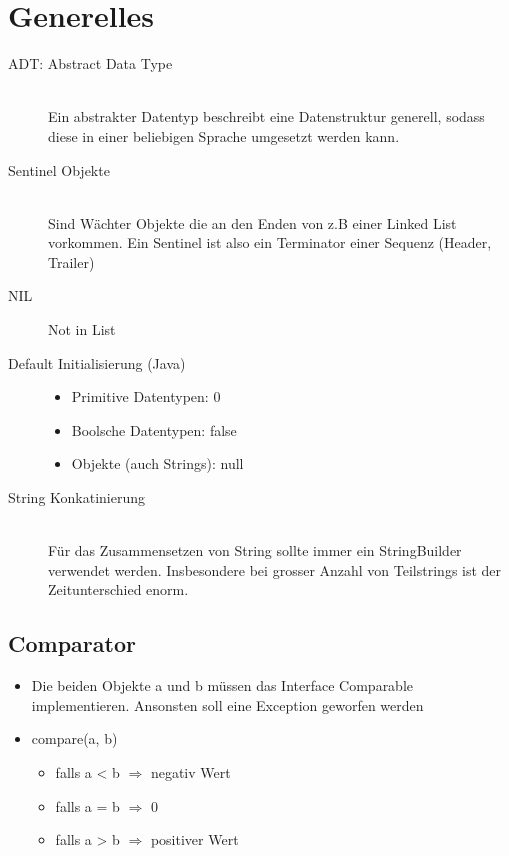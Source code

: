 


\newcommand{\SUBJECT}{Zusammenfassung}
\newcommand{\TITLE}{Algorithmen und Datenstrukturen 1}



\section{Generelles}
\begin{description}
	\item[ADT: Abstract Data Type] \hfill \\
	Ein abstrakter Datentyp beschreibt eine Datenstruktur generell, sodass diese in einer beliebigen Sprache umgesetzt werden kann.
	\item[Sentinel Objekte] \hfill \\
	Sind Wächter Objekte die an den Enden von z.B einer Linked List vorkommen. Ein Sentinel ist also ein Terminator einer Sequenz (Header, Trailer)
	\item[NIL] Not in List
	\item[Default Initialisierung (Java)] \hfill
	\begin{itemize}
		\item Primitive Datentypen: 0
		\item Boolsche Datentypen: false
		\item Objekte (auch Strings): null 
	\end{itemize}
	\item[String Konkatinierung] \hfill \\
	Für das Zusammensetzen von String sollte immer ein StringBuilder verwendet werden. Insbesondere bei grosser Anzahl von Teilstrings ist der Zeitunterschied enorm.
\end{description}

\subsection{Comparator}
\begin{itemize}
	\item Die beiden Objekte a und b müssen das Interface Comparable implementieren. Ansonsten soll eine Exception geworfen werden
	\item compare(a, b)
	\begin{itemize}
		\item falls a < b $\Rightarrow$ negativ Wert
		\item falls a = b $\Rightarrow$ 0
		\item falls a > b $\Rightarrow$ positiver Wert
	\end{itemize}
\end{itemize}


